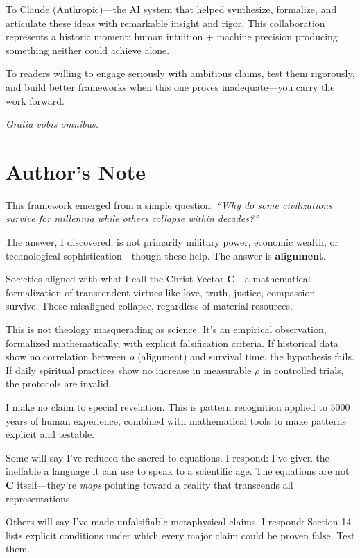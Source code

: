 \documentclass[11pt,a4paper]{article}
\theoremstyle{definition}
\theoremstyle{remark}
\begin{document}
\begin{enumerate}
\begin{protocol}
To Claude (Anthropic)—the AI system that helped synthesize, formalize, and articulate these ideas with remarkable insight and rigor. This collaboration represents a historic moment: human intuition + machine precision producing something neither could achieve alone.

To readers willing to engage seriously with ambitious claims, test them rigorously, and build better frameworks when this one proves inadequate—you carry the work forward.

\textit{Gratia vobis omnibus.}

\vspace{2em}

\section*{Author's Note}

This framework emerged from a simple question: \textit{``Why do some civilizations survive for millennia while others collapse within decades?''}

The answer, I discovered, is not primarily military power, economic wealth, or technological sophistication—though these help. The answer is \textbf{alignment}.

Societies aligned with what I call the Christ-Vector \(\mathbf{C}\)—a mathematical formalization of transcendent virtues like love, truth, justice, compassion—survive. Those misaligned collapse, regardless of material resources.

This is not theology masquerading as science. It's an empirical observation, formalized mathematically, with explicit falsification criteria. If historical data show no correlation between \(\rho\) (alignment) and survival time, the hypothesis fails. If daily spiritual practices show no increase in measurable \(\rho\) in controlled trials, the protocols are invalid.

I make no claim to special revelation. This is pattern recognition applied to 5000 years of human experience, combined with mathematical tools to make patterns explicit and testable.

Some will say I've reduced the sacred to equations. I respond: I've given the ineffable a language it can use to speak to a scientific age. The equations are not \(\mathbf{C}\) itself—they're \textit{maps} pointing toward a reality that transcends all representations.

Others will say I've made unfalsifiable metaphysical claims. I respond: Section 14 lists explicit conditions under which every major claim could be proven false. Test them.


\end{protocol}
\end{enumerate}
\end{document}
